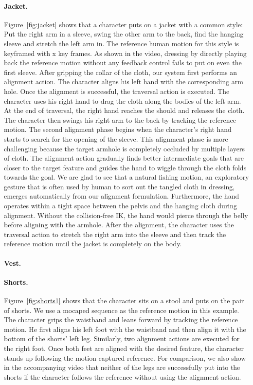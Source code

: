 \paragraph{Jacket.} Figure~\ref{fig:jacket} shows that a character puts on a jacket with a common style: Put the right arm in a sleeve, swing the other arm to the back, find the hanging sleeve and stretch the left arm in. The reference human motion for this style is keyframed with x key frames. As shown in the video, dressing by directly playing back the reference motion without any feedback control fails to put on even the first sleeve. After gripping the collar of the cloth, our system first performs an alignment action. The character aligns his left hand with the corresponding arm hole. Once the alignment is successful, the traversal action is executed. The character uses his right hand to drag the cloth along the bodies of the left arm. At the end of traversal, the right hand reaches the should and releases the cloth. The character then swings his right arm to the back by tracking the reference motion. The second alignment phase begins when the character's right hand starts to search for the opening of the sleeve. This alignment phase is more challenging because the target armhole is completely occluded by multiple layers of cloth. The alignment action gradually finds better intermediate goals that are closer to the target feature and guides the hand to wiggle through the cloth folds towards the goal. We are glad to see that a natural fishing motion, an exploratory gesture that is often used by human to sort out the tangled cloth in dressing, emerges automatically from our alignment formulation. Furthermore, the hand operates within a tight space between the pelvis and the hanging cloth during alignment. Without the collision-free IK, the hand would pierce through the belly before aligning with the armhole. After the alignment, the character uses the traversal action to stretch the right arm into the sleeve and then track the reference motion until the jacket is completely on the body.

\paragraph{Vest.}



\paragraph{Shorts.} Figure~\ref{fig:shorts1} shows that the character sits on a stool and puts on the pair of shorts. We use a mocaped sequence as the reference motion in this example. The character grips the waistband and leans forward by tracking the reference motion. He first aligns his left foot with the waistband and then align it with the bottom of the shorts' left leg. Similarly, two alignment actions are executed for the right foot. Once both feet are aligned with the desired feature, the character stands up following the motion captured reference. For comparison, we also show in the accompanying video that neither of the legs are successfully put into the shorts if the character follows the reference without using the alignment action.

